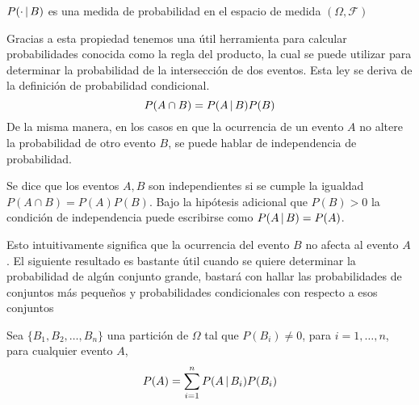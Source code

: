 \begin{Prop}
    $P(\cdot\thinspace|\thinspace B)$ es una medida de probabilidad en el espacio de medida $(\Omega,\mathscr{F})$
\end{Prop}
Gracias a esta propiedad tenemos una útil herramienta para calcular probabilidades conocida como la regla del producto, la cual se puede utilizar para determinar la probabilidad de la intersección de dos eventos. Esta ley se deriva de la definición de probabilidad condicional.
$$P(A\cap B)=P(A\thinspace|\thinspace B)P(B)$$
De la misma manera, en los casos en que la ocurrencia de un evento $A$ no altere la probabilidad de otro evento $B$, se puede hablar de independencia de probabilidad.
\begin{Def}
    Se dice que los eventos $A, B$ son independientes si se cumple la igualdad $P(A\cap B)=P(A)P(B)$. Bajo la hipótesis adicional que $P(B)>0$ la condición de independencia puede escribirse como $P(A\thinspace|\thinspace B)=P(A)$.
\end{Def}
 Esto intuitivamente significa que la ocurrencia del evento $B$ no afecta al evento $A$.
El siguiente resultado es bastante útil cuando se quiere determinar la probabilidad de algún conjunto grande, bastará con hallar las probabilidades de conjuntos más pequeños y probabilidades condicionales con respecto a esos conjuntos
\begin{Teo}
    Sea $\{B_1,B_2,\ldots,B_n\}$ una partición de $\Omega$ tal que $P(B_i)\not=0$, para  $i=1,\ldots,n$, para cualquier evento $A$, $$P(A)=\sum_{i=1}^n P(A\thinspace|\thinspace B_i)P(B_i)$$
\end{Teo}

